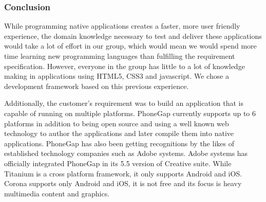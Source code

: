 \subsubsection{Conclusion}
While programming native applications creates a faster, more user friendly experience, the domain knowledge necessary to test and deliver these applications would take a lot of effort in our group, which would mean we would spend more time learning new programming languages than fulfilling the requirement specification. However, everyone in the group has little to a lot of knowledge making in applications using HTML5, CSS3 and javascript. We chose a development framework based on this previous experience.

Additionally, the customer's requirement was to build an application that is capable of running on multiple platforms. PhoneGap currently supports up to 6 platforms in addition to being open source and using a well known web technology to author the applications and later compile them into native applications. PhoneGap has also been getting recognitions by the likes of established technology companies such as Adobe systems.  Adobe systems has officially integrated PhoneGap in its 5.5 version of Creative suite. While Titanium is a cross platform framework, it only supports Android and iOS. Corona supports only Android and iOS, it is not free and its focus is heavy multimedia content and graphics.

